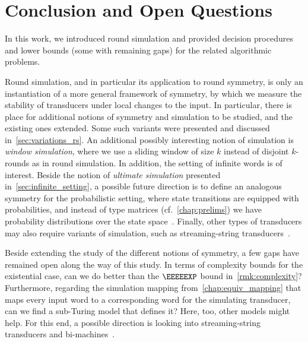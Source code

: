 \chapter{Conclusion and Open Questions}
\label{chap:conclusion}
\label{chap:discussion}
\label{chap:future}
 
In this work, we introduced round simulation and provided decision procedures and lower bounds (some with remaining gaps) for the related algorithmic problems.

Round simulation, and in particular its application to round symmetry, is only an instantiation of a more general framework of symmetry, by which we measure the stability of transducers under local changes to the input. In particular, there is place for additional notions of symmetry and simulation to be studied, and the existing ones extended. Some such variants were presented and discussed in~\cref{sec:variations_rs}. An additional possibly interesting notion of simulation is \emph{window simulation}, where we use a sliding window of size $k$ instead of disjoint $k$-rounds as in round simulation.
In addition, the setting of infinite words is of interest. Beside the notion of \emph{ultimate simulation} presented in~\cref{sec:infinite_setting}, a possible future direction is to define an analogous symmetry for the probabilistic setting, where state transitions are equipped with probabilities, and instead of type matrices (cf.~\cref{chap:prelims}) we have probability distributions over the state space~\cite{Almagor2020b}.
Finally, other types of transducers may also require variants of simulation, such as streaming-string transducers~\cite{Alur2010}.

Beside extending the study of the different notions of symmetry, a few gaps have remained open along the way of this study. In terms of complexity bounds for the existential case, can we do better than the $\EEEEEXP$ bound in~\cref{rmk:complexity}?
Furthermore, regarding the simulation mapping from~\cref{chap:equiv_mapping} that maps every input word to a corresponding word for the simulating transducer, can we find a sub-Turing model that defines it? Here, too, other models might help. For this end, a possible direction is looking into streaming-string transducers and bi-machines~\cite{Muscholl}.
